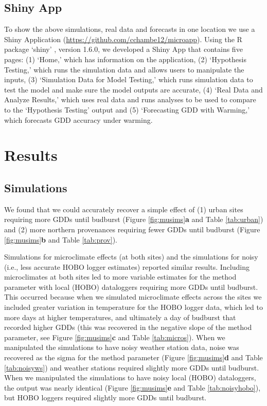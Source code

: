 \documentclass{article}\usepackage[]{graphicx}\usepackage[]{color}
\begin{document}
\subsection*{Shiny App}
To show the above simulations, real data and forecasts in one location we use a Shiny Application (\url{https://github.com/cchambe12/microapp}). Using the R package `shiny' \citep{shiny2021}, version 1.6.0, we developed a Shiny App that contains five pages: (1) `Home,' which has information on the application, (2) `Hypothesis Testing,' which runs the simulation data and allows users to manipulate the inputs, (3) `Simulation Data for Model Testing,' which runs simulation data to test the model and make sure the model outputs are accurate, (4) `Real Data and Analyze Results,' which uses real data and runs analyses to be used to compare to the `Hypothesis Testing' output and (5) `Forecasting GDD with Warming,' which forecasts GDD accuracy under warming. 

\section*{Results}
\subsection*{Simulations}
We found that we could accurately recover a simple effect of (1) urban sites requiring more GDDs until budburst (Figure \ref{fig:musims}\textbf{a} and Table \ref{tab:urban}) and (2) more northern provenances requiring fewer GDDs until budburst (Figure \ref{fig:musims}\textbf{b} and Table \ref{tab:prov}). 

Simulations for microclimate effects (at both sites) and the simulations for noisy (i.e., less accurate HOBO logger estimates) reported similar results.  Including microclimates at both sites led to more variable estimates for the method parameter with local (HOBO) dataloggers requiring more GDDs until budburst. This occurred because when we simulated microclimate effects across the sites we included greater variation in temperature for the HOBO logger data, which led to more days at higher temperatures, and ultimately a day of budburst that recorded higher GDDs (this was recovered in the negative slope of the method parameter, see Figure \ref{fig:musims}\textbf{c} and Table \ref{tab:micros}). When we manipulated the simulations to have noisy weather station data, noise was recovered as the sigma for the method parameter (Figure \ref{fig:musims}\textbf{d} and Table \ref{tab:noisyws}) and weather stations required slightly more GDDs until budburst. When we manipulated the simulations to have noisy local (HOBO) dataloggers, the output was nearly identical (Figure \ref{fig:musims}\textbf{e} and Table \ref{tab:noisyhobo}), but HOBO loggers required slightly more GDDs until budburst. 
  
\end{document}

